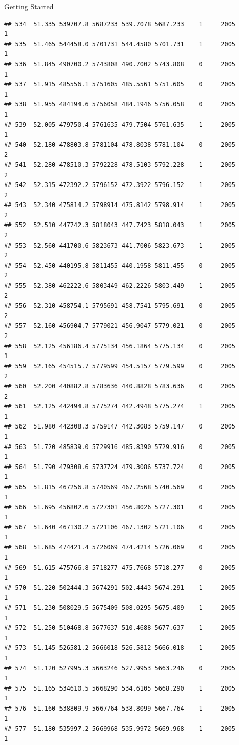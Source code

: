 \documentclass[
  ignorenonframetext,
]{beamer}
\begin{document}
\begin{frame}[fragile]{Getting Started}
\begin{verbatim}
## 534  51.335 539707.8 5687233 539.7078 5687.233    1     2005        1
## 535  51.465 544458.0 5701731 544.4580 5701.731    1     2005        1
## 536  51.845 490700.2 5743808 490.7002 5743.808    0     2005        1
## 537  51.915 485556.1 5751605 485.5561 5751.605    0     2005        1
## 538  51.955 484194.6 5756058 484.1946 5756.058    0     2005        1
## 539  52.005 479750.4 5761635 479.7504 5761.635    1     2005        1
## 540  52.180 478803.8 5781104 478.8038 5781.104    0     2005        2
## 541  52.280 478510.3 5792228 478.5103 5792.228    1     2005        2
## 542  52.315 472392.2 5796152 472.3922 5796.152    1     2005        2
## 543  52.340 475814.2 5798914 475.8142 5798.914    1     2005        2
## 552  52.510 447742.3 5818043 447.7423 5818.043    1     2005        2
## 553  52.560 441700.6 5823673 441.7006 5823.673    1     2005        2
## 554  52.450 440195.8 5811455 440.1958 5811.455    0     2005        2
## 555  52.380 462222.6 5803449 462.2226 5803.449    1     2005        2
## 556  52.310 458754.1 5795691 458.7541 5795.691    0     2005        2
## 557  52.160 456904.7 5779021 456.9047 5779.021    0     2005        2
## 558  52.125 456186.4 5775134 456.1864 5775.134    0     2005        1
## 559  52.165 454515.7 5779599 454.5157 5779.599    0     2005        2
## 560  52.200 440882.8 5783636 440.8828 5783.636    0     2005        2
## 561  52.125 442494.8 5775274 442.4948 5775.274    1     2005        1
## 562  51.980 442308.3 5759147 442.3083 5759.147    0     2005        1
## 563  51.720 485839.0 5729916 485.8390 5729.916    0     2005        1
## 564  51.790 479308.6 5737724 479.3086 5737.724    0     2005        1
## 565  51.815 467256.8 5740569 467.2568 5740.569    0     2005        1
## 566  51.695 456802.6 5727301 456.8026 5727.301    0     2005        1
## 567  51.640 467130.2 5721106 467.1302 5721.106    0     2005        1
## 568  51.685 474421.4 5726069 474.4214 5726.069    0     2005        1
## 569  51.615 475766.8 5718277 475.7668 5718.277    0     2005        1
## 570  51.220 502444.3 5674291 502.4443 5674.291    1     2005        1
## 571  51.230 508029.5 5675409 508.0295 5675.409    1     2005        1
## 572  51.250 510468.8 5677637 510.4688 5677.637    1     2005        1
## 573  51.145 526581.2 5666018 526.5812 5666.018    1     2005        1
## 574  51.120 527995.3 5663246 527.9953 5663.246    0     2005        1
## 575  51.165 534610.5 5668290 534.6105 5668.290    1     2005        1
## 576  51.160 538809.9 5667764 538.8099 5667.764    1     2005        1
## 577  51.180 535997.2 5669968 535.9972 5669.968    1     2005        1

\end{verbatim}
\end{frame}
\end{document}

